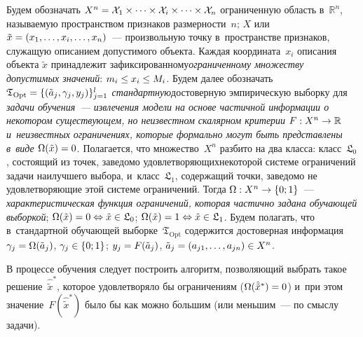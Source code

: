 \begin{multicols}{2}
Будем обозначать $X^n\hm=\mathcal{X}_1\times \cdots \times \mathcal{X}_i 
\times\cdots \times \mathcal{X}_n$  ограниченную область в~$\mathbb{R}^n$, 
на\-зы\-ва\-емую пространством  признаков размерности~$n$;  $X$ 
или~$\tilde{x}\hm=(x_1, \ldots , x_i, \ldots , x_n)$~--- 
произвольную точку в~пространстве признаков, служащую описанием\linebreak  
допус\-ти\-мо\-го объекта.
Каждая координата~$x_i$ описания объекта $\tilde{x}$
принадлежит зафиксированному\linebreak \textit{ограниченному множеству 
допустимых значений}:  $m_i\hm \leq x_i \hm\leq M_i$.
Будем далее обозначать %
$\mathfrak{T}_{\mathrm{Opt}}\hm=\{ (\tilde{a}_j,\gamma_j,y_j)\}_{j=1}^l$ 
\textit{стандартную}\linebreak достоверную эмпирическую выборку  для 
\textit{задачи  обучения~--- извлечения модели  на основе частичной  
информации о некотором существующем, но неизвестном скалярном критерии 
$F:X^n \hm\rightarrow \mathbb{R}$ и~неизвестных ограничениях, 
которые формально могут быть представлены в~виде $\Omega(\tilde{x})\hm=0$}. 
Полагается, что множество~$X^n$ разбито  на два класса: класс~$\mathfrak{L}_0$, 
состоящий из точек, заведомо удовлетворяющих\linebreak некоторой  системе ограничений 
задачи наилучшего выбора, и~класс~$\mathfrak{L}_1$, содержащий точки, 
заведомо не удовлетворяющие этой системе ограничений. Тогда 
$\Omega: X^n \hm\rightarrow \{0;1 \}$~--- 
\textit{\mbox{характеристическая} функция ограничений, которая частично 
задана обуча\-ющей выборкой}; $\Omega(\tilde{x})\hm=0 
\hm\Leftrightarrow \tilde{x}\hm\in \mathfrak{L}_0$; 
$\Omega(\tilde{x})\hm=1 \hm\Leftrightarrow \tilde{x}\hm\in \mathfrak{L}_1$. 
Будем полагать, что в~стандартной обучающей выборке~$\mathfrak{T}_{\mathrm{Opt}}$ 
содержится достоверная информация  $\gamma_j\hm=\Omega(\tilde{a}_j)$, 
$\gamma_j \hm\in \{0;1 \}$; $y_j\hm=F(\tilde{a}_j)$, $\tilde{a}_j\hm=
(a_{j1},\dots, a_{jn})\hm\in X^n$.

В процессе обучения следует построить алгоритм, позволяющий выбрать 
такое решение~$\hat{\tilde{x}}^{*}$, которое удовлетворяло 
бы ограничениям ($\Omega(\hat{\tilde{x}}^{*})\hm=0$) и~при этом 
значение~$F(\hat{\tilde{x}}^{*})$ было бы как можно б$\acute{\mbox{о}}$льшим (или меньшим~--- 
по смыслу задачи).

 \renewcommand{\figurename}{\protect\bf Алгоритм}
\setcounter{figure}{0}

\begin{figure*}[b] %
\vspace*{-12pt}
\vspace*{2ex}


\end{figure*}
\end{multicols}
